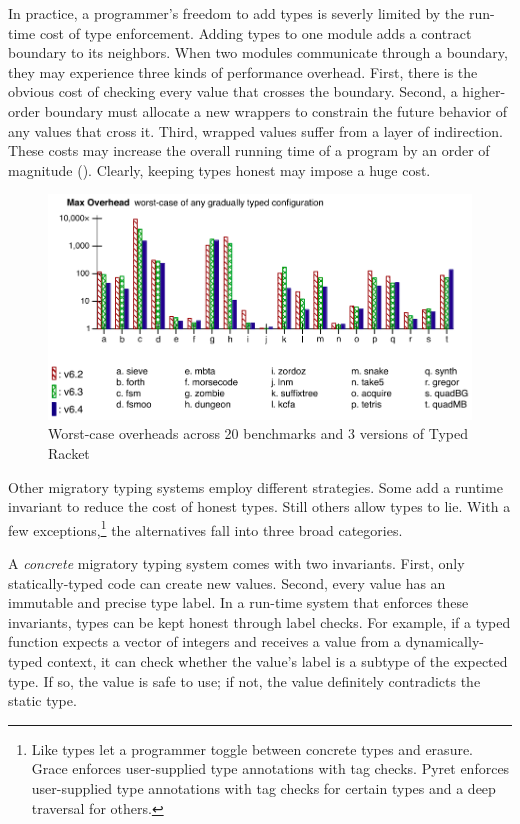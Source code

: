 In practice, a programmer's freedom to add types is severly limited by
 the run-time cost of type enforcement.
Adding types to one module adds a contract boundary to its neighbors.
When two modules communicate through a boundary, they may experience three kinds
 of performance overhead.
First, there is the obvious cost of checking every value that crosses the
 boundary.
Second, a higher-order boundary must allocate a new wrappers to constrain the
 future behavior of any values that cross it.
Third, wrapped values suffer from a layer of indirection.
These costs may increase the overall running time of a program by an order
 of magnitude ().
Clearly, keeping types honest may impose a huge cost.

\begin{figure}[h]
  \includegraphics[width=0.8\columnwidth]{src/jfp-2019-max.png}
  \caption{Worst-case overheads across 20 benchmarks and 3 versions of Typed Racket~\cite{gtnffvf-jfp-2019}}
  \label{fig:max-overhead}
\end{figure}

Other migratory typing systems employ different strategies.
Some add a runtime invariant to reduce the cost of honest types.
Still others allow types to lie.
With a few exceptions,\footnote{Like types
 let a programmer toggle between concrete types and erasure.
 Grace enforces user-supplied type annotations with tag checks.
 Pyret enforces user-supplied type annotations with tag checks
  for certain types and a deep traversal for others.}
 the alternatives fall into three broad categories.

A \emph{concrete}\/ migratory typing system comes with two invariants.
First, only statically-typed code can create new values.
Second, every value has an immutable and precise type label.
In a run-time system that enforces these invariants, types can be kept honest
 through label checks.
For example, if a typed function expects a vector of integers and receives
 a value from a dynamically-typed context, it can check whether the value's
 label is a subtype of the expected type.
If so, the value is safe to use; if not, the value definitely contradicts the
static type.

